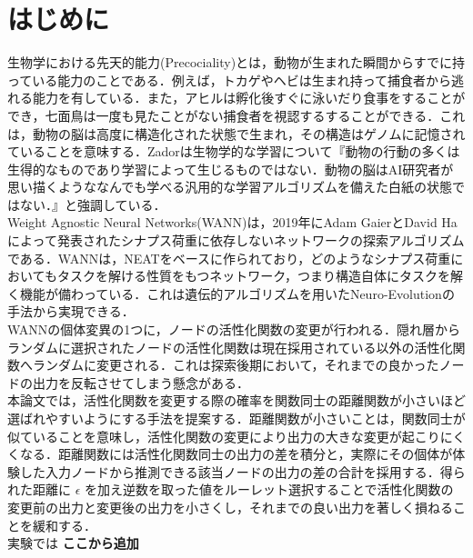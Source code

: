 \section{はじめに}
生物学における先天的能力(Precociality)とは，動物が生まれた瞬間からすでに持っている能力のことである．例えば，トカゲやヘビは生まれ持って捕食者から逃れる能力を有している．また，アヒルは孵化後すぐに泳いだり食事をすることができ，七面鳥は一度も見たことがない捕食者を視認するすることができる．これは，動物の脳は高度に構造化された状態で生まれ，その構造はゲノムに記憶されていることを意味する．Zadorは生物学的な学習について『動物の行動の多くは生得的なものであり学習によって生じるものではない．動物の脳はAI研究者が思い描くようななんでも学べる汎用的な学習アルゴリズムを備えた白紙の状態ではない．』と強調している\cite{先天的能力}．\\
Weight Agnostic Neural Networks(WANN)は，2019年にAdam GaierとDavid Haによって発表されたシナプス荷重に依存しないネットワークの探索アルゴリズムである\cite{WANN}．WANNは，NEAT\cite{NEAT}をベースに作られており，どのようなシナプス荷重においてもタスクを解ける性質をもつネットワーク，つまり構造自体にタスクを解く機能が備わっている．これは遺伝的アルゴリズム\cite{遺伝的アルゴリズム}を用いたNeuro-Evolution\cite{NE}の手法から実現できる．\\
WANNの個体変異の1つに，ノードの活性化関数の変更が行われる．隠れ層からランダムに選択されたノードの活性化関数は現在採用されている以外の活性化関数へランダムに変更される．これは探索後期において，それまでの良かったノードの出力を反転させてしまう懸念がある．\\
本論文では，活性化関数を変更する際の確率を関数同士の距離関数が小さいほど選ばれやすいようにする手法を提案する．距離関数が小さいことは，関数同士が似ていることを意味し，活性化関数の変更により出力の大きな変更が起こりにくくなる．距離関数には活性化関数同士の出力の差を積分と，実際にその個体が体験した入力ノードから推測できる該当ノードの出力の差の合計を採用する．得られた距離に $ \epsilon $ を加え逆数を取った値をルーレット選択することで活性化関数の変更前の出力と変更後の出力を小さくし，それまでの良い出力を著しく損ねることを緩和する．\\
実験では \textbf{ここから追加}